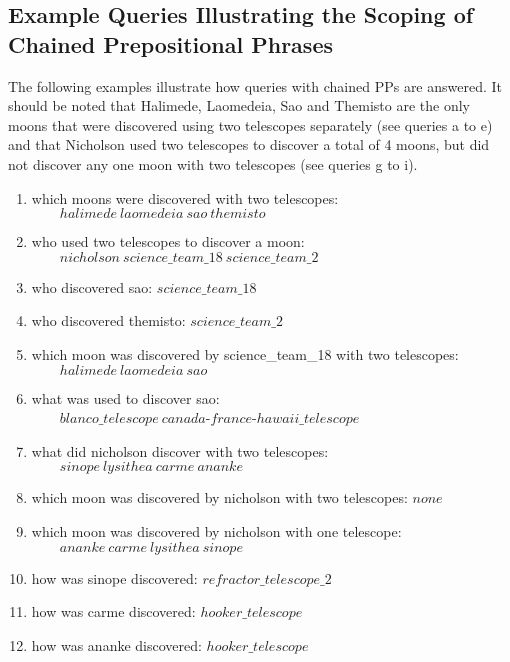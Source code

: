 \documentclass[../main.tex]{subfiles}
\begin{document}
\begin{refsection}
\subsection{Example Queries Illustrating the Scoping of Chained Prepositional Phrases}

The following examples illustrate how queries with chained PPs are answered.
It should be noted that Halimede, Laomedeia, Sao and
Themisto are the only moons that were discovered using two
telescopes separately (see queries a to e) and that Nicholson used two telescopes to discover a total of 4
moons, but did not discover any one moon with two telescopes (see queries g to i).

\begin{enumerate}[label=\alph*.]
	\setlength\itemsep{0em}
	\item which moons were discovered with two telescopes: \\ $\mathit{\qquad halimede\ laomedeia\ sao\ themisto}$
	\item who used two telescopes to discover a moon: \\ $\mathit{\qquad nicholson\ science\_team\_18\ science\_team\_2}$
	\item who discovered sao: $\mathit{science\_team\_18}$
	\item who discovered themisto: $\mathit{science\_team\_2}$
	\item which moon was discovered by science\_team\_18 with two telescopes: \\ $\mathit{\qquad halimede\ laomedeia\ sao}$
	\item what was used to discover sao: \\ $\mathit{\qquad blanco\_telescope\ canada}$-$\mathit{france}$-$\mathit{hawaii\_telescope}$
	\item what did nicholson discover with two telescopes: \\ $\mathit{\qquad sinope\ lysithea\ carme\ ananke}$
	\item which moon was discovered by nicholson with two telescopes: $\mathit{none}$
	\item which moon was discovered by nicholson with one telescope: \\ $\mathit{\qquad ananke\ carme\ lysithea\ sinope}$
	\item how was sinope discovered: $\mathit{refractor\_telescope\_2}$
	\item how was carme discovered: $\mathit{hooker\_telescope}$
	\item how was ananke discovered: $\mathit{hooker\_telescope}$

\end{enumerate}
\end{refsection}
\end{document}
